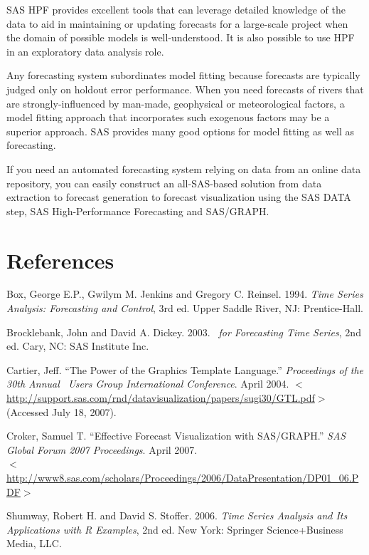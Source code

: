 \documentclass[10pt]{sugconf-ish}
\begin{document}
SAS HPF provides excellent tools that can leverage detailed knowledge of the data to aid in maintaining or updating forecasts for a large-scale project when the domain of possible models is well-understood. It is also possible to use HPF in an exploratory data analysis role.

Any forecasting system subordinates model fitting because forecasts are typically judged only on holdout error performance. When you need forecasts of rivers that are strongly-influenced by man-made, geophysical or meteorological factors, a model fitting approach that incorporates such exogenous factors may be a superior approach. SAS provides many good options for model fitting as well as forecasting.

If you need an automated forecasting system relying on data from an online data repository, you can easily construct an all-SAS-based solution from data extraction to forecast generation to forecast visualization using the SAS DATA step, SAS High-Performance Forecasting and SAS/GRAPH.




\section{References}

\begin{list}{}{\setlength{\leftmargin}{2em}\setlength{\itemindent}{0em}\raggedright}
\item Box, George E.P., Gwilym M. Jenkins and Gregory C. Reinsel. 1994. 
\emph{Time Series Analysis: Forecasting and Control}, 3rd ed. Upper Saddle River, NJ: Prentice-Hall.

\item Brocklebank, John and David A. Dickey. 2003. 
\emph{\SASregistered\ for Forecasting Time Series}, 2nd ed. Cary, NC: SAS Institute Inc.

\item Cartier, Jeff. ``The Power of the Graphics Template Language.'' \emph{Proceedings of the 30th Annual \SASregistered\ Users Group International Conference}. April 2004. %
$<$\url{http://support.sas.com/rnd/datavisualization/papers/sugi30/GTL.pdf}$>$ (Accessed July 18, 2007).

\item Croker, Samuel T. ``Effective Forecast Visualization with SAS/GRAPH.'' \emph{SAS Global Forum 2007 Proceedings}. April 2007. \\ $<$\url{http://www8.sas.com/scholars/Proceedings/2006/DataPresentation/DP01_06.PDF}$>$

\item Shumway, Robert H. and David S. Stoffer. 2006. 
\emph{Time Series Analysis and Its Applications with R Examples}, 2nd ed. New York: Springer Science+Business Media, LLC.
\end{list}
\end{document}
